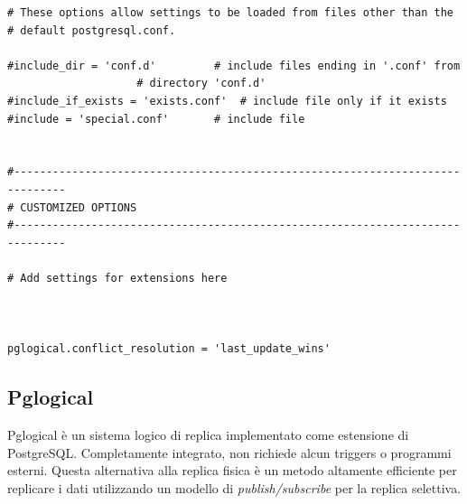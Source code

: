 \begin{verbatim}
# These options allow settings to be loaded from files other than the
# default postgresql.conf.

#include_dir = 'conf.d'			# include files ending in '.conf' from
					# directory 'conf.d'
#include_if_exists = 'exists.conf'	# include file only if it exists
#include = 'special.conf'		# include file


#------------------------------------------------------------------------------
# CUSTOMIZED OPTIONS
#------------------------------------------------------------------------------

# Add settings for extensions here



pglogical.conflict_resolution = 'last_update_wins'
\end{verbatim}
 \vspace{-0.3cm}
 
\item
\subsection{Pglogical}
Pglogical \`{e} un sistema logico di replica implementato come estensione di PostgreSQL. Completamente integrato, non richiede alcun triggers o programmi esterni. Questa alternativa alla replica fisica \`{e} un metodo altamente efficiente per replicare i dati utilizzando un modello di \textit{publish/subscribe} per la replica selettiva.\cite{etichetta3}

